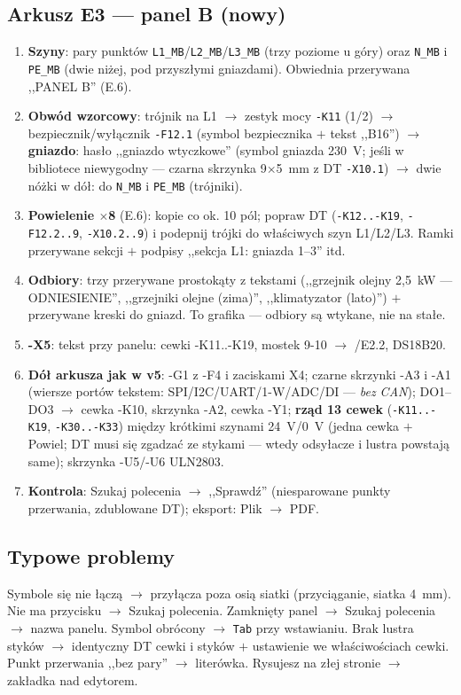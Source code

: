\documentclass[11pt,a4paper]{article}
\begin{document}
\subsection{Arkusz E3 --- panel B (nowy)}
\begin{enumerate}
\item \textbf{Szyny}: pary punktów \texttt{L1\_MB}/\texttt{L2\_MB}/\texttt{L3\_MB} (trzy poziome
u góry) oraz \texttt{N\_MB} i \texttt{PE\_MB} (dwie niżej, pod przyszłymi gniazdami). Obwiednia
przerywana ,,PANEL B'' (E.6).
\item \textbf{Obwód wzorcowy}: trójnik na L1 $\to$ zestyk mocy \texttt{-K11} (1/2) $\to$
bezpiecznik/wyłącznik \texttt{-F12.1} (symbol bezpiecznika $+$ tekst ,,B16'') $\to$ \textbf{gniazdo}:
hasło ,,gniazdo wtyczkowe'' (symbol gniazda 230~V; jeśli w bibliotece niewygodny --- czarna
skrzynka 9$\times$5~mm z DT \texttt{-X10.1}) $\to$ dwie nóżki w dół: do \texttt{N\_MB}
i \texttt{PE\_MB} (trójniki).
\item \textbf{Powielenie $\times$8} (E.6): kopie co ok. 10 pól; popraw DT (\texttt{-K12..-K19},
\texttt{-F12.2..9}, \texttt{-X10.2..9}) i podepnij trójki do właściwych szyn L1/L2/L3. Ramki
przerywane sekcji $+$ podpisy ,,sekcja L1: gniazda 1--3'' itd.
\item \textbf{Odbiory}: trzy przerywane prostokąty z tekstami (,,grzejnik olejny 2,5~kW ---
ODNIESIENIE'', ,,grzejniki olejne (zima)'', ,,klimatyzator (lato)'') $+$ przerywane kreski do
gniazd. To grafika --- odbiory są wtykane, nie na stałe.
\item \textbf{-X5}: tekst przy panelu: cewki -K11..-K19, mostek 9-10 $\to$ /E2.2, DS18B20.
\item \textbf{Dół arkusza jak w v5}: -G1 z -F4 i zaciskami X4; czarne skrzynki -A3 i -A1 (wiersze
portów tekstem: SPI/I2C/UART/1-W/ADC/DI --- \emph{bez CAN}); DO1--DO3 $\to$ cewka -K10, skrzynka
-A2, cewka -Y1; \textbf{rząd 13 cewek} (\texttt{-K11..-K19}, \texttt{-K30..-K33}) między krótkimi
szynami 24~V/0~V (jedna cewka $+$ Powiel; DT musi się zgadzać ze stykami --- wtedy odsyłacze
i lustra powstają same); skrzynka -U5/-U6 ULN2803.
\item \textbf{Kontrola}: Szukaj polecenia $\to$ ,,Sprawdź'' (niesparowane punkty przerwania,
zdublowane DT); eksport: Plik $\to$ PDF.
\end{enumerate}

\subsection{Typowe problemy}
Symbole się nie łączą $\to$ przyłącza poza osią siatki (przyciąganie, siatka 4~mm). Nie ma
przycisku $\to$ Szukaj polecenia. Zamknięty panel $\to$ Szukaj polecenia $\to$ nazwa panelu.
Symbol obrócony $\to$ \texttt{Tab} przy wstawianiu. Brak lustra styków $\to$ identyczny DT cewki
i styków $+$ ustawienie we właściwościach cewki. Punkt przerwania ,,bez pary'' $\to$ literówka.
Rysujesz na złej stronie $\to$ zakładka nad edytorem.
\end{document}
